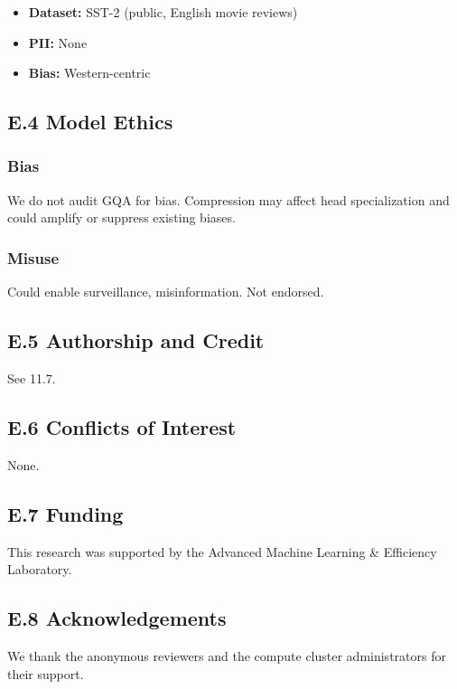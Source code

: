 \begin{itemize}
\item \textbf{Dataset:} SST-2 (public, English movie reviews)
\item \textbf{PII:} None
\item \textbf{Bias:} Western-centric

\end{itemize}
\subsection{E.4 Model Ethics}

\subsubsection{Bias}

We do not audit GQA for bias. Compression may affect head specialization 
and could amplify or suppress existing biases.

\subsubsection{Misuse}

Could enable surveillance, misinformation. Not endorsed.

\subsection{E.5 Authorship and Credit}

See  11.7.

\subsection{E.6 Conflicts of Interest}

None.

\subsection{E.7 Funding}

This research was supported by the Advanced Machine Learning \& Efficiency Laboratory.

\subsection{E.8 Acknowledgements}

We thank the anonymous reviewers and the compute cluster administrators for their support.

